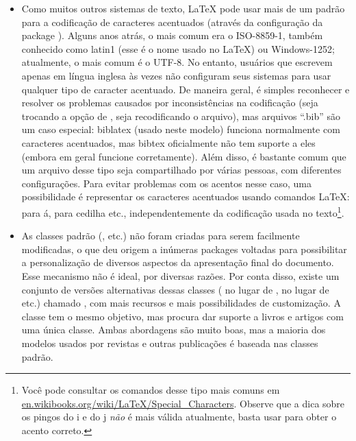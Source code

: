 \begin{itemize}
    \item Como muitos outros sistemas de texto, \LaTeX{} pode usar mais de
    um padrão para a codificação de caracteres acentuados (através da
    configuração da package ). Alguns anos atrás,
    o mais comum era o ISO-8859-1, também conhecido como latin1 (esse é o
    nome usado no \LaTeX{}) ou Windows-1252; atualmente, o mais comum é o
    UTF-8. No entanto, usuários que escrevem apenas em língua inglesa às
    vezes não configuram seus sistemas para usar qualquer tipo de caracter
    acentuado. De maneira geral, é simples reconhecer e resolver os problemas
    causados por inconsistências na codificação (seja trocando a opção
    de , seja recodificando o arquivo), mas arquivos ``.bib''
    são um caso especial: biblatex (usado neste modelo) funciona normalmente
    com caracteres acentuados, mas bibtex oficialmente não tem suporte a eles
    (embora em geral funcione corretamente). Além disso, é bastante comum que
    um arquivo desse tipo seja compartilhado por várias pessoas, com diferentes
    configurações. Para evitar problemas com os acentos
    nesse caso, uma possibilidade é representar os caracteres acentuados
    usando comandos \LaTeX{}:  para á,
     para cedilha etc., independentemente da
    codificação usada no texto\footnote{Você pode consultar os comandos
    desse tipo mais comuns em \url{en.wikibooks.org/wiki/LaTeX/Special_Characters}.
    Observe que a dica sobre os pingos do i e do j \emph{não} é mais
    válida atualmente, basta usar  para
    obter o acento correto.}.

    \item As classes padrão (,  etc.) não foram criadas
    para serem facilmente modificadas, o que deu origem a inúmeras packages
    voltadas para possibilitar a personalização de diversos aspectos da
    apresentação final do documento. Esse mecanismo não é ideal, por diversas
    razões. Por conta disso, existe um conjunto de versões alternativas dessas
    classes ( no lugar de ,  no lugar de
     etc.) chamado , com mais recursos e mais
    possibilidades de customização. A classe  tem o mesmo objetivo,
    mas procura dar suporte a livros e artigos com uma única classe. Ambas
    abordagens são muito boas, mas a maioria dos modelos usados por revistas e
    outras publicações é baseada nas classes padrão.
\end{itemize}
